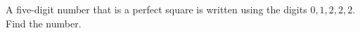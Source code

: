 A five-digit number that is a perfect square is written using the digits $0, 1, 2, 2, 2$. Find the number.
